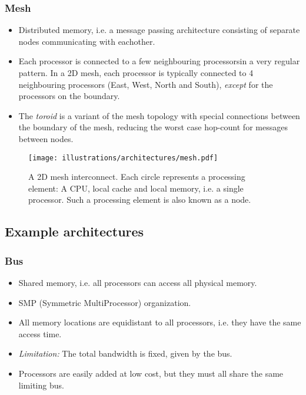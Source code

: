 \subsubsection{Mesh} %
\label{ssub:mesh}

\begin{itemize}
  \item Distributed memory, i.e. a message passing architecture consisting of separate nodes communicating with eachother.
  \item Each processor is connected to a few neighbouring processorsin a very regular pattern. In a 2D mesh, each processor is typically connected to 4 neighbouring processors (East, West, North and South), \emph{except} for the processors on the boundary.
  \item The \emph{toroid} is a variant of the mesh topology with special connections between the boundary of the mesh, reducing the worst case hop-count for messages between nodes.
\end{itemize}

\begin{figure}[htbp]
  \centering
  \texttt{[image: illustrations/architectures/mesh.pdf]}
  \caption{A 2D mesh interconnect. Each circle represents a processing element: A CPU, local cache and local memory, i.e. a single processor. Such a processing element is also known as a node.}
  \label{fig:mesh}
\end{figure}




\subsection{Example architectures} %
\label{sub:example_architectures}

\subsubsection{Bus} %
\label{ssub:bus}

\begin{itemize}
  \item Shared memory, i.e. all processors can access all physical memory.
  \item SMP (Symmetric MultiProcessor) organization.
  \item All memory locations are equidistant to all processors, i.e. they have the same access time.
  \item \emph{Limitation:} The total bandwidth is fixed, given by the bus.
  \item Processors are easily added at low cost, but they must all share the same limiting bus.
\end{itemize}


